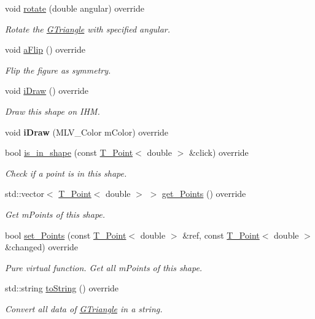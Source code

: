 \begin{DoxyCompactItemize}
void \hyperlink{classGTriangle_ae3ed75bbad4ba7fed68bc06c5834cfbe}{rotate} (double angular) override
\begin{DoxyCompactList}\small\item\em Rotate the \hyperlink{classGTriangle}{G\+Triangle} with specified angular. \end{DoxyCompactList}\item 
\mbox{\label{classGTriangle_ab223d049ce2518095201b99c8940e724}} 
void \hyperlink{classGTriangle_ab223d049ce2518095201b99c8940e724}{aFlip} () override
\begin{DoxyCompactList}\small\item\em Flip the figure as symmetry. \end{DoxyCompactList}\item 
\mbox{\label{classGTriangle_adb7a211b65860ce4dfcc13275cd5052d}} 
void \hyperlink{classGTriangle_adb7a211b65860ce4dfcc13275cd5052d}{iDraw} () override
\begin{DoxyCompactList}\small\item\em Draw this shape on I\+HM. \end{DoxyCompactList}\item 
\mbox{\label{classGTriangle_a33275fad5395d0bf0d17b1ad0c8ec393}} 
void {\bfseries iDraw} (M\+L\+V\+\_\+\+Color mColor) override
\item 
bool \hyperlink{classGTriangle_abb6f7243155483cc6de301931e87475a}{is\+\_\+in\+\_\+shape} (const \hyperlink{classPoint}{T_Point}$<$ double $>$ \&click) override
\begin{DoxyCompactList}\small\item\em Check if a point is in this shape. \end{DoxyCompactList}\item 
std\+::vector$<$ \hyperlink{classPoint}{T_Point}$<$ double $>$ $>$ \hyperlink{classGTriangle_add4581d1b52836142de5817de4d52d17}{get\+\_\+\+Points} () override
\begin{DoxyCompactList}\small\item\em Get mPoints of this shape. \end{DoxyCompactList}\item
bool \hyperlink{classGTriangle_adb9dae329128600209c54cc4587480ee}{set\+\_\+\+Points} (const \hyperlink{classPoint}{T_Point}$<$ double $>$ \&ref, const \hyperlink{classPoint}{T_Point}$<$ double $>$ \&changed) override
\begin{DoxyCompactList}\small\item\em Pure virtual function. Get all mPoints of this shape. \end{DoxyCompactList}\item
std\+::string \hyperlink{classGTriangle_a8381aeea39fac0d52ad9e0d45b791b3b}{to\+String} () override
\begin{DoxyCompactList}\small\item\em Convert all data of \hyperlink{classGTriangle}{G\+Triangle} in a string. \end{DoxyCompactList}\end{DoxyCompactItemize}
